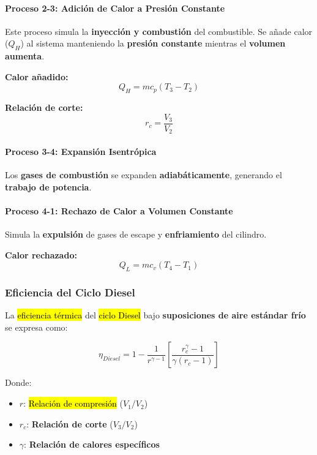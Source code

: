\documentclass{article}
\begin{document}
    \paragraph{Proceso 2-3: Adición de Calor a Presión Constante}
    Este proceso simula la \textbf{inyección y combustión} del combustible. Se añade calor ($Q_H$) al sistema manteniendo la \textbf{presión constante} mientras el \textbf{volumen aumenta}.

    \textbf{Calor añadido:}
    \begin{equation}
    Q_H = m c_p (T_3 - T_2)
    \end{equation}

    \textbf{Relación de corte:}
    \begin{equation}
    r_c = \frac{V_3}{V_2}
    \end{equation}

    \paragraph{Proceso 3-4: Expansión Isentrópica}
    Los \textbf{gases de combustión} se expanden \textbf{adiabáticamente}, generando el \textbf{trabajo de potencia}.

    \paragraph{Proceso 4-1: Rechazo de Calor a Volumen Constante}
    Simula la \textbf{expulsión} de gases de escape y \textbf{enfriamiento} del cilindro.

    \textbf{Calor rechazado:}
    \begin{equation}
    Q_L = m c_v (T_4 - T_1)
    \end{equation}

    \subsubsection{Eficiencia del Ciclo Diesel}

    La \hl{eficiencia térmica} del \hl{ciclo Diesel} bajo \textbf{suposiciones de aire estándar frío} se expresa como:

    \begin{equation}
    \eta_{Diesel} = 1 - \frac{1}{r^{\gamma-1}} \left[ \frac{r_c^{\gamma} - 1}{\gamma (r_c - 1)} \right]
    \end{equation}

    Donde:
    \begin{itemize}
        \item $r$: \hl{Relación de compresión} ($V_1/V_2$)
        \item $r_c$: \textbf{Relación de corte} ($V_3/V_2$)
        \item $\gamma$: \textbf{Relación de calores específicos}
    \end{itemize}
\end{document}
